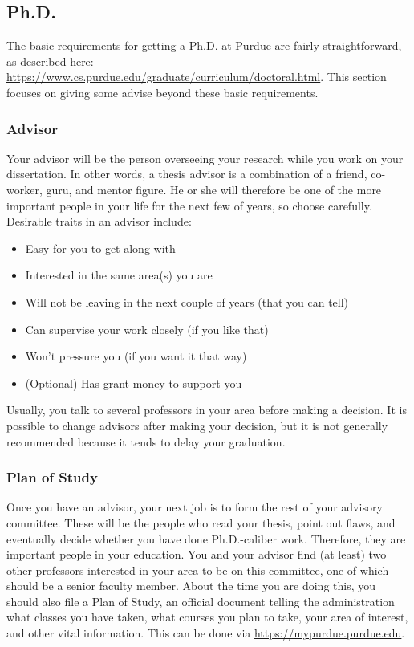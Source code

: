 \subsection{Ph.D.}

The basic requirements for getting a Ph.D. at Purdue are fairly straightforward, as described here: \url{https://www.cs.purdue.edu/graduate/curriculum/doctoral.html}. This section focuses on giving some advise beyond these basic requirements.

\subsubsection{Advisor}
Your advisor will be the person overseeing your research while you work on your dissertation. In other words, a thesis advisor is a combination of a friend, co-worker, guru, and mentor figure. He or she will therefore be one of the more important people in your life for the next few of years, so choose carefully. Desirable traits in an advisor include:

\begin{itemize}
	\item Easy for you to get along with
	\item Interested in the same area(s) you are
	\item Will not be leaving in the next couple of years (that you can tell)
	\item Can supervise your work closely (if you like that)
	\item Won't pressure you (if you want it that way)
	\item (Optional) Has grant money to support you
\end{itemize}

Usually, you talk to several professors in your area before making a decision. It is possible to change advisors after making your decision, but it is not generally recommended because it tends to delay your graduation.

\subsubsection{Plan of Study}
Once you have an advisor, your next job is to form the rest of your advisory committee. These will be the people who read your thesis, point out flaws, and eventually decide whether you have done Ph.D.-caliber work. Therefore, they are important people in your education. You and your advisor find (at least) two other professors interested in your area to be on this committee, one of which should be a senior faculty member. About the time you are doing this, you should also file a Plan of Study, an official document telling the administration what classes you have taken, what courses you plan to take, your area of interest, and other vital information. This can be done via \url{https://mypurdue.purdue.edu}.

